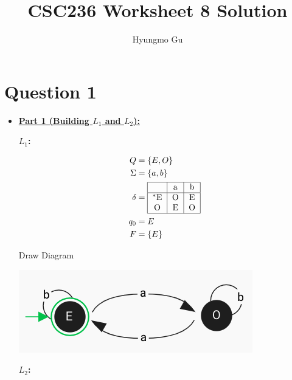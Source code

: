 \documentclass[12pt]{article}
\begin{document}
\title{CSC236 Worksheet 8 Solution}
\author{Hyungmo Gu}
\maketitle

\section*{Question 1}

\bigskip

\begin{itemize}
    \item

    \underline{\textbf{Part 1 (Building $L_1$ and $L_2$):}}

    \bigskip

    \textbf{$L_1$:}

    \bigskip

    \begin{align*}
        Q &= \{E,O\}\\
        \Sigma &= \{a,b\}\\
        \delta &= \begin{tabular}{|c|c|c|}
        \hline
          & a & b\\
        \hline
        $^*$E & O & E\\
        O & E & O\\
        \hline
        \end{tabular}\\
        q_0 &= E\\
        F &= \{E\}
    \end{align*}

    \bigskip

    Draw Diagram

    \begin{center}
    \includegraphics[width=0.7 \linewidth]{images/worksheet_8_solution_1.png}
    \end{center}

    \bigskip

    \textbf{$L_2$:}

    \bigskip


\end{itemize}
\end{document}

